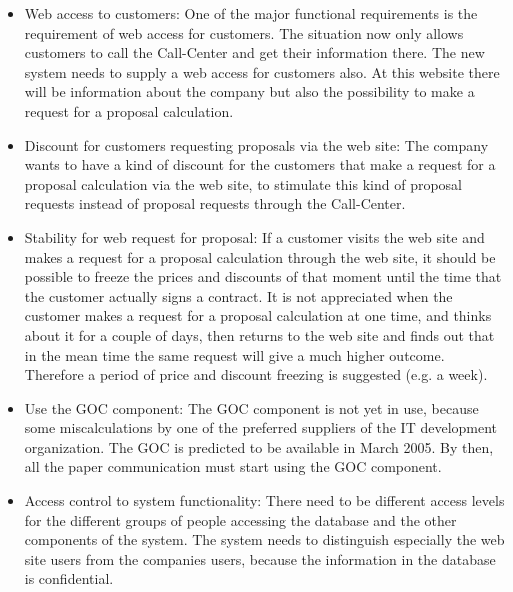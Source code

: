 \begin{itemize}
\item Web access to customers: One of the major functional
requirements is the requirement of web access for customers. The
situation now only allows customers to call the Call-Center and get
their information there. The new system needs to supply a web
access for customers also. At this website there will be information
about the company but also the possibility to make a request for a
proposal calculation.
\item Discount for customers requesting
proposals via the web site: The company wants to have a kind of
discount for the customers that make a request for a proposal
calculation via the web site, to stimulate this kind of proposal
requests instead of proposal requests through the Call-Center.
\item Stability for web request for proposal: If a customer visits
the web site and makes a request for a proposal calculation through
the web site, it should be possible to freeze the prices and
discounts of that moment until the time that the customer actually
signs a contract. It is not appreciated when the customer makes a
request for a proposal calculation at one time, and thinks about
it for a couple of days, then returns to the web site and finds
out that in the mean time the same request will give a much higher
outcome. Therefore a period of price and discount freezing is
suggested (e.g. a week).
\item Use the GOC component: The GOC
component is not yet in use, because some miscalculations by one
of the preferred suppliers of the IT development organization. The
GOC is predicted to be available in March 2005. By then, all the
paper communication must start using the GOC component.
\item Access control to system functionality: There need to be different
access levels for the different groups of people accessing the
database and the other components of the system. The system needs
to distinguish especially the web site users from the companies
users, because the information in the database is confidential.
\end{itemize}

